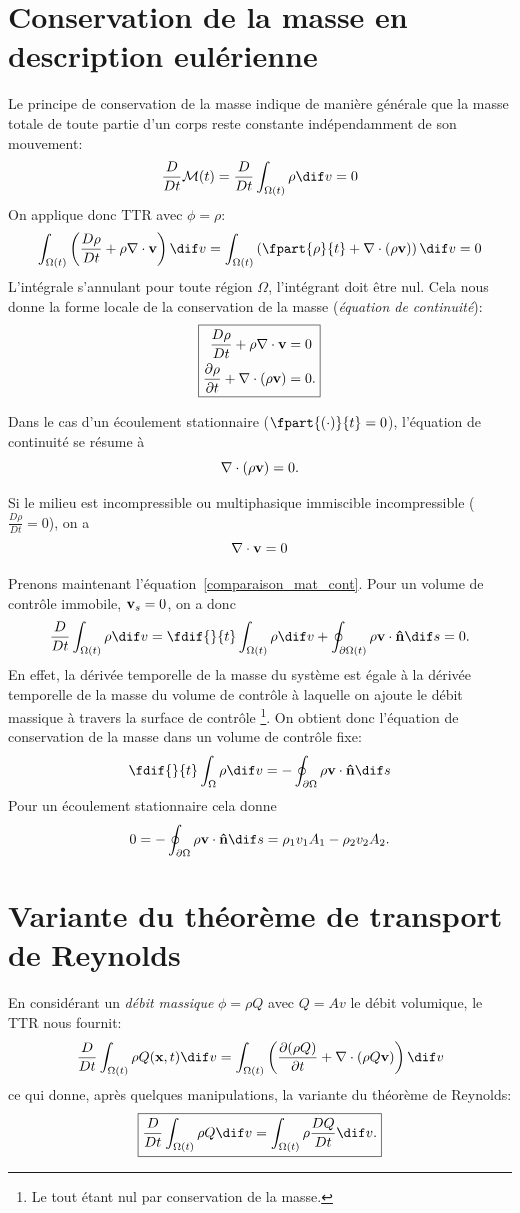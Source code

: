 \section{Conservation de la masse en description eulérienne}
Le principe de conservation de la masse indique de manière générale que la masse totale de toute partie d'un corps reste constante indépendamment de son mouvement:
\[ \frac{D}{Dt}\mathcal{M}(t)=\frac{D}{Dt}\int_{\Omega (t)}\rho \dif v = 0 \]
On applique donc TTR avec $\phi=\rho$:
\[ \int_{\Omega (t)}\left(\frac{D\rho}{Dt} + \rho\nabla\cdot\fv{v}\right) \dif v =
\int_{\Omega (t)}\left(\fpart{\rho}{t} + \nabla\cdot(\rho\fv{v})\right) \dif v = 0 \]
L'intégrale s'annulant pour toute région $\Omega$, l'intégrant doit être nul.
Cela nous donne la forme locale de la conservation de la masse (\emph{équation de continuité}):
\[ \boxed{
    \begin{aligned}
      \frac{D\rho}{Dt}+\rho\nabla\cdot\textbf{v} & = 0 \\
      \frac{\partial \rho}{\partial t}+\nabla\cdot(\rho\textbf{v}) & = 0.
    \end{aligned}
} \]

Dans le cas d'un écoulement stationnaire ($\fpart{(\cdot)}{t} = 0$),
l'équation de continuité se résume à
\[ \nabla\cdot(\rho\textbf{v}) = 0. \]

Si le milieu est incompressible ou multiphasique immiscible incompressible ($\frac{D\rho}{Dt}=0$),
on a
\[ \nabla\cdot\textbf{v} = 0 \]

Prenons maintenant l'équation~\eqref{comparaison_mat_cont}.
Pour un volume de contrôle immobile, $\textbf{v}_s = 0$, on a donc
\[ \frac{D}{Dt}\int_{\Omega (t)}\rho \dif v = \fdif{}{t}\int_{\Omega (t)}\rho  \dif v+\oint_{\partial\Omega (t)}\rho\fv{v}\cdot\fv{\^n} \dif s=0. \]
En effet, la dérivée temporelle de la masse du système est égale à la dérivée temporelle de la masse du volume de contrôle à laquelle on ajoute le débit massique à travers la surface de contrôle
\footnote{Le tout étant nul par conservation de la masse.}.
On obtient donc l'équation de conservation de la masse dans un volume de contrôle fixe:
\[ \fdif{}{t}\int_{\Omega }\rho \dif v = -\oint_{\partial\Omega} \rho\fv{v}\cdot\fv{\^n} \dif s \]
Pour un écoulement stationnaire cela donne
\[ 0 = -\oint_{\partial\Omega}\rho\fv{v}\cdot\fv{\^n} \dif s = \rho_1v_1A_1-\rho_2v_2A_2. \]

\section{Variante du théorème de transport de Reynolds}
En considérant un \emph{débit massique} $\phi = \rho Q$ avec $Q = Av$ le débit volumique, le TTR nous fournit:
$$\frac{D}{Dt}\int_{\Omega (t)}\rho Q(\fv{x},t) \dif v=\int_{\Omega (t)}\left(\frac{\partial(\rho Q)}{\partial t}+\nabla\cdot(\rho Q\fv{v})\right) \dif v$$ ce qui donne, après quelques manipulations, la variante du théorème de Reynolds:
\begin{equation}
  \label{ttr2}
  \boxed{\frac{D}{Dt}\int_{\Omega (t)}\rho Q \dif v=\int_{\Omega(t)}\rho\frac{DQ}{Dt} \dif v.}
\end{equation}

